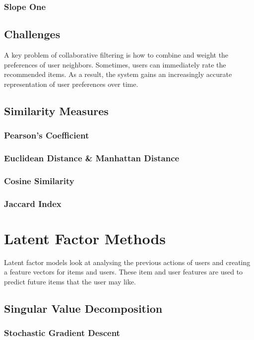 \subsubsection{Slope One}

\subsection{Challenges}
A key problem of collaborative filtering is how to combine and weight the preferences of user neighbors. Sometimes, users can immediately rate the recommended items. As a result, the system gains an increasingly accurate representation of user preferences over time.

\subsection{Similarity Measures}
\subsubsection{Pearson's Coefficient}
\subsubsection{Euclidean Distance \& Manhattan Distance}
\subsubsection{Cosine Similarity}
\subsubsection{Jaccard Index}

\section{Latent Factor Methods}

Latent factor models look at analysing the previous actions of users and creating a feature vectors for items and users. These item and user features are used to predict future items that the user may like. 

\subsection{Singular Value Decomposition}
\subsubsection{Stochastic Gradient Descent}
